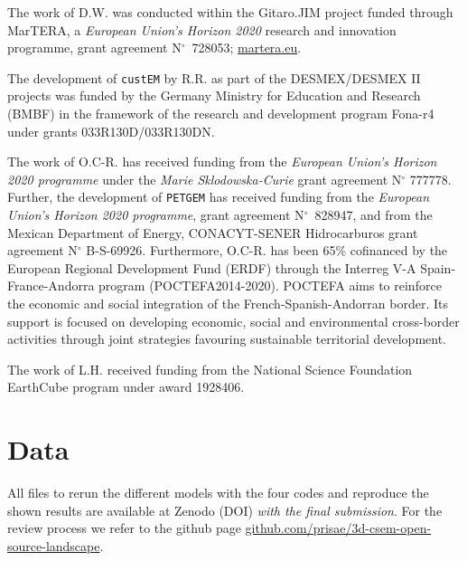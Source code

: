 \documentclass[
    paper,
  ]{geophysics}
\newcommand{\custem}{\texttt{custEM}\xspace}
\newcommand{\petgem}{\texttt{PETGEM}\xspace}
\begin{document}
The work of D.W. was conducted within the Gitaro.JIM project funded through MarTERA, a \emph{European Union's Horizon 2020} research and innovation programme, grant agreement N$^\circ$~728053; \href{https://www.martera.eu}{martera.eu}.

The development of \custem by R.R. as part of the DESMEX/DESMEX II projects was funded by the Germany Ministry for Education and Research (BMBF) in the framework of the research and development program Fona-r4 under grants 033R130D/033R130DN.

The work of O.C-R. has received funding from the \emph{European Union's Horizon 2020 programme} under the \emph{Marie Sklodowska-Curie} grant agreement N$^\circ$ 777778. Further, the development of \petgem has received funding from the \emph{European Union's Horizon 2020 programme}, grant agreement N$^\circ$~828947, and from the Mexican Department of Energy, CONACYT-SENER Hidrocarburos grant agreement N$^\circ$ B-S-69926. Furthermore, O.C-R. has been 65\% cofinanced by the European Regional Development Fund (ERDF) through the Interreg V-A Spain-France-Andorra program (POCTEFA2014-2020). POCTEFA aims to reinforce the economic and social integration of the French-Spanish-Andorran border. Its support is focused on developing economic, social and environmental cross-border activities through joint strategies favouring sustainable territorial development.

The work of L.H. received funding from the National Science Foundation EarthCube program under award 1928406.

\section{Data}

All files to rerun the different models with the four codes and reproduce the shown results are available at Zenodo (DOI) \emph{with the final submission}. For the review process we refer to the github page \href{https://github.com/prisae/3d-csem-open-source-landscape}{github.com/prisae/3d-csem-open-source-landscape}.


\end{document}
